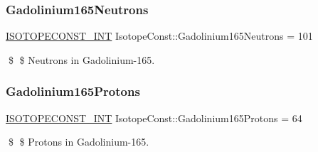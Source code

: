\subsubsection{\texorpdfstring{Gadolinium165\+Neutrons}{Gadolinium165Neutrons}}
{\footnotesize\ttfamily \mbox{\hyperlink{group___isotope_const-_macros_ga5f18360b3e99483a35c32d789e62621c}{I\+S\+O\+T\+O\+P\+E\+C\+O\+N\+S\+T\+\_\+\+I\+NT}} Isotope\+Const\+::\+Gadolinium165\+Neutrons = 101}

\$ \$ Neutrons in Gadolinium-\/165. \mbox{\label{group___isotope_const-_gadolinium-_gd165_ga32cd5306dd0a9ac5f60a87e8bec68f0a}} 
\subsubsection{\texorpdfstring{Gadolinium165\+Protons}{Gadolinium165Protons}}
{\footnotesize\ttfamily \mbox{\hyperlink{group___isotope_const-_macros_ga5f18360b3e99483a35c32d789e62621c}{I\+S\+O\+T\+O\+P\+E\+C\+O\+N\+S\+T\+\_\+\+I\+NT}} Isotope\+Const\+::\+Gadolinium165\+Protons = 64}

\$ \$ Protons in Gadolinium-\/165. 